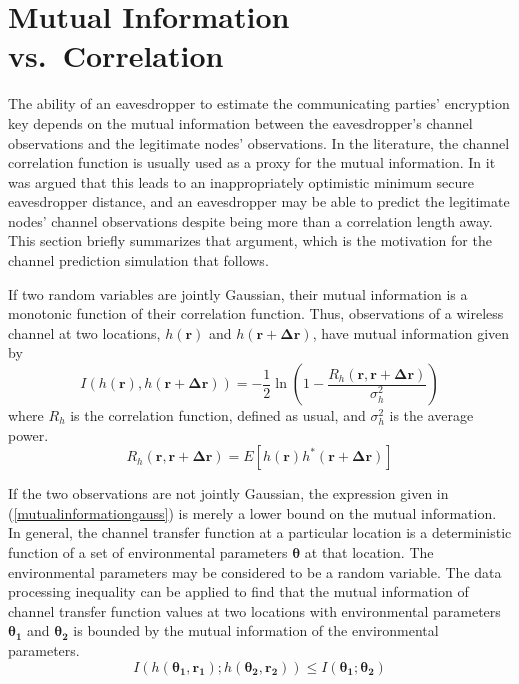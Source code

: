 \documentclass{allertonproc}
\begin{document}
\section{Mutual Information vs.~Correlation}\label{mutualinfo} %
The ability of an eavesdropper to estimate the communicating parties' encryption key depends on the mutual information between the eavesdropper's channel observations and the legitimate nodes' observations.  In the literature, the channel correlation function is usually used as a proxy for the mutual information.  In \cite{kckpVTC2015} it was argued that this leads to an inappropriately optimistic minimum secure eavesdropper distance, and an eavesdropper may be able to predict the legitimate nodes' channel observations despite being more than a correlation length away.  This section briefly summarizes that argument, which is the motivation for the channel prediction simulation that follows.

If two random variables are jointly Gaussian, their mutual information is a monotonic function of their correlation function.  Thus, observations of a wireless channel at two locations, $h(\mathbf{r})$ and $h(\mathbf{r}+\mathbf{\Delta r})$, have mutual information given by 
\begin{equation}\label{mutualinformationgauss}
I(h(\mathbf{r}),h(\mathbf{r}+\mathbf{\Delta r})) = -\frac{1}{2}\ln\left(1-\frac{R_h(\mathbf{r},\mathbf{r}+\mathbf{\Delta r})}{\sigma_h^2}\right)
\end{equation}
where $R_h$ is the correlation function, defined as usual, and $\sigma_h^2$ is the average power.
\begin{equation}
R_h(\mathbf{r},\mathbf{r}+\mathbf{\Delta r}) = E[h(\mathbf{r})h^*(\mathbf{r}+\mathbf{\Delta r})]
\end{equation}

If the two observations are not jointly Gaussian, the expression given in (\ref{mutualinformationgauss}) is merely a lower bound on the mutual information.  In general, the channel transfer function at a particular location is a deterministic function of a set of environmental parameters $\boldsymbol{\theta}$ at that location. The environmental parameters may be considered to be a random variable. The data processing inequality can be applied to find that the mutual information of channel transfer function values at two locations with environmental parameters $\boldsymbol{\theta_1}$ and $\boldsymbol{\theta_2}$ is bounded by the mutual information of the environmental parameters.
\begin{equation}
I(h(\boldsymbol{\theta_1},\mathbf{r_1}); h(\boldsymbol{\theta_2},\mathbf{r_2}))\leq I(\boldsymbol{\theta_1}; \boldsymbol{\theta_2})
\end{equation}
\end{document}
